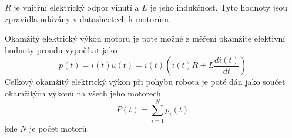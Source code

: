 $R$ je vnitřní elektrický odpor vinutí a $L$ je jeho indukčnost. Tyto hodnoty jsou zpravidla udávány v datasheetech k motorům.

Okamžitý elektrický výkon motoru je poté možné z měření okamžité efektivní hodnoty proudu vypočítat jako 
\begin{equation}
p(t) = i(t)u(t) = i(t)\left(i(t)R + L\frac{di(t)}{dt}\right)
\label{motor_power_eq}
\end{equation} 
Celkový okamžitý elektrický výkon při pohybu robota je poté dán jako součet okamžitých výkonů na všech jeho motorech
\begin{equation}
P(t) = \sum_{i=1}^{N} p_i(t)
\label{robot_motor_power_eq}
\end{equation} 
kde $N$ je počet motorů.

